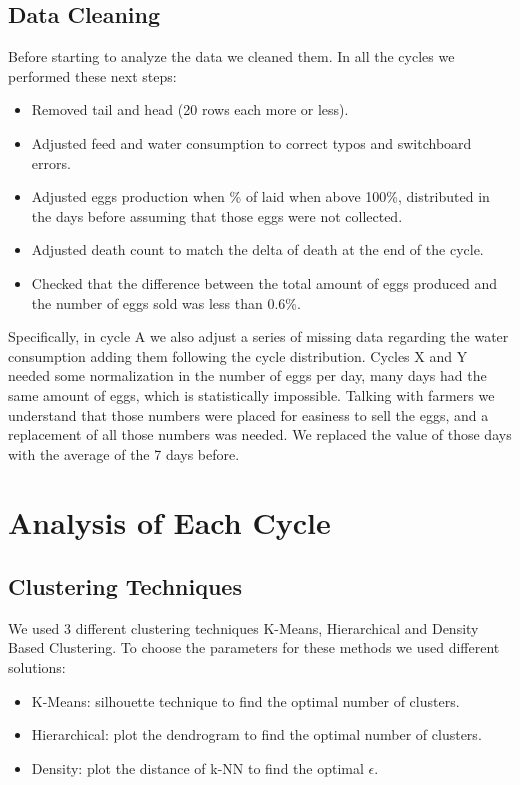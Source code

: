 \documentclass[11pt]{article}
\begin{document}
\subsection{Data Cleaning}
Before starting to analyze the data we cleaned them.
In all the cycles we performed these next steps:
\begin{itemize}
    \item Removed tail and head (20 rows each more or less).
    \item Adjusted feed and water consumption to correct typos and switchboard errors.
    \item Adjusted eggs production when \% of laid when above 100\%, distributed in the days before assuming that those eggs were not collected.
    \item Adjusted death count to match the delta of death at the end of the cycle.
    \item Checked that the difference between the total amount of eggs produced and the number of eggs sold was less than 0.6\%.
\end{itemize}

Specifically, in cycle A we also adjust a series of missing data regarding the water consumption adding them following the cycle distribution.
Cycles X and Y needed some normalization in the number of eggs per day, many days had the same amount of eggs, which is statistically impossible. Talking with farmers we understand that those numbers were placed for easiness to sell the eggs, and a replacement of all those numbers was needed. We replaced the value of those days with the average of the 7 days before.

\section{Analysis of Each Cycle}
\subsection{Clustering Techniques}
We used 3 different clustering techniques K-Means, Hierarchical and Density Based Clustering.
To choose the parameters for these methods we used different solutions:
\begin{itemize}
    \item K-Means: silhouette technique to find the optimal number of clusters.
    \item Hierarchical: plot the dendrogram to find the optimal number of clusters.
    \item Density: plot the distance of k-NN to find the optimal $\epsilon$.
\end{itemize}
\end{document}
